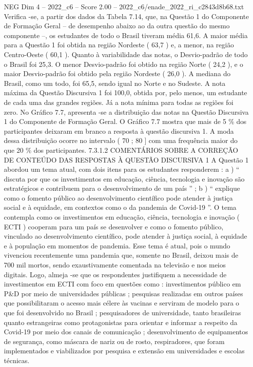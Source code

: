 \begin{textsample}{NEG Dim 4 – 2022\_c6 – Score 2.00 – 2022\_c6/enade\_2022\_ri\_c2843d8b68.txt}
Verifica -se, a partir dos dados da Tabela 7.14, que, na Questão 1 do Componente de Formação Geral – de desempenho abaixo ao da outra questão do mesmo componente –, os estudantes de todo o Brasil tiveram média 61,6.
A maior média para a Questão 1 foi obtida na região Nordeste ( 63,7 ) e, a menor, na região Centro-Oeste ( 60,1 ).
Quanto à variabilidade das notas, o Desvio-padrão de todo o Brasil foi 25,3.
O menor Desvio-padrão foi obtido na região Norte ( 24,2 ), e o maior Desvio-padrão foi obtido pela região Nordeste ( 26,0 ).
A mediana do Brasil, como um todo, foi 65,5, sendo igual no Norte e no Sudeste.
A nota máxima da Questão Discursiva 1 foi 100,0, obtida por, pelo menos, um estudante de cada uma das grandes regiões.
Já a nota mínima para todas as regiões foi zero.
No Gráfico 7.7, apresenta -se a distribuição das notas na Questão Discursiva 1 do Componente de Formação Geral.
O Gráfico 7.7 mostra que mais de 5 \% dos participantes deixaram em branco a resposta à questão discursiva 1.
A moda dessa distribuição ocorre no intervalo ( 70 ; 80 ] com uma frequência maior do que 20 \% dos participantes. 7.3.1.2 COMENTÁRIOS SOBRE A CORREÇÃO DE CONTEÚDO DAS RESPOSTAS À QUESTÃO DISCURSIVA 1 A Questão 1 abordou um tema atual, com dois itens para os estudantes responderem : a ) “ discuta por que os investimentos em educação, ciência, tecnologia e inovação são estratégicos e contribuem para o desenvolvimento de um país ” ; b ) “ explique como o fomento público ao desenvolvimento científico pode atender à justiça social e à equidade, em contextos como o da pandemia de Covid-19 ”.
O tema contempla como os investimentos em educação, ciência, tecnologia e inovação ( ECTI ) cooperam para um país se desenvolver e como o fomento público, vinculado ao desenvolvimento científico, pode atender à justiça social, à equidade e à população em momentos de pandemia.
Esse tema é atual, pois o mundo vivenciou recentemente uma pandemia que, somente no Brasil, deixou mais de 700 mil mortos, sendo exaustivamente comentada na televisão e nos meios digitais.
Logo, almeja -se que os respondentes justifiquem a necessidade de investimentos em ECTI com foco em questões como : investimentos público em P\&D por meio de universidades públicas ; pesquisas realizadas em outros países que possibilitaram o acesso mais célere às vacinas e serviram de modelo para o que foi desenvolvido no Brasil ; pesquisadores de universidade, tanto brasileiras quanto estrangeiras como protagonistas para orientar e informar a respeito da Covid-19 por meio dos canais de comunicação ; desenvolvimento de equipamentos de segurança, como máscara de nariz ou de rosto, respiradores, que foram implementados e viabilizados por pesquisa e extensão em universidades e escolas técnicas.

\end{textsample}
